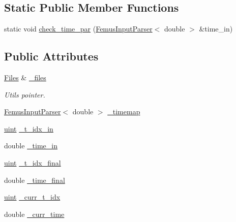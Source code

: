 \subsection*{Static Public Member Functions}
\begin{DoxyCompactItemize}
\item 
static void \mbox{\hyperlink{classfemus_1_1_time_loop_a3fd317c7b76accfc11bc90ef28faa314}{check\+\_\+time\+\_\+par}} (\mbox{\hyperlink{classfemus_1_1_femus_input_parser}{Femus\+Input\+Parser}}$<$ double $>$ \&time\+\_\+in)
\end{DoxyCompactItemize}
\subsection*{Public Attributes}
\begin{DoxyCompactItemize}
\item 
\mbox{\hyperlink{classfemus_1_1_files}{Files}} \& \mbox{\hyperlink{classfemus_1_1_time_loop_ae9163945615963893a94d21a63084676}{\+\_\+files}}
\begin{DoxyCompactList}\small\item\em Utils pointer. \end{DoxyCompactList}\item 
\mbox{\hyperlink{classfemus_1_1_femus_input_parser}{Femus\+Input\+Parser}}$<$ double $>$ \mbox{\hyperlink{classfemus_1_1_time_loop_a0ad720cecced417ce134d55b54b2425d}{\+\_\+timemap}}
\item 
\mbox{\hyperlink{_typedefs_8hpp_a91ad9478d81a7aaf2593e8d9c3d06a14}{uint}} \mbox{\hyperlink{classfemus_1_1_time_loop_ad4afef07e11923ccc8660b3ecb312021}{\+\_\+t\+\_\+idx\+\_\+in}}
\item 
double \mbox{\hyperlink{classfemus_1_1_time_loop_a70b7f421b4428653119817938db3ad04}{\+\_\+time\+\_\+in}}
\item 
\mbox{\hyperlink{_typedefs_8hpp_a91ad9478d81a7aaf2593e8d9c3d06a14}{uint}} \mbox{\hyperlink{classfemus_1_1_time_loop_af6baf9c8f64e06b6c185c4da894992a7}{\+\_\+t\+\_\+idx\+\_\+final}}
\item 
double \mbox{\hyperlink{classfemus_1_1_time_loop_a2f9a639404e384df4da36a2a0c71c589}{\+\_\+time\+\_\+final}}
\item 
\mbox{\hyperlink{_typedefs_8hpp_a91ad9478d81a7aaf2593e8d9c3d06a14}{uint}} \mbox{\hyperlink{classfemus_1_1_time_loop_af353bddb15dfc34a47296817b4eff67a}{\+\_\+curr\+\_\+t\+\_\+idx}}
\item 
double \mbox{\hyperlink{classfemus_1_1_time_loop_a49814512e2f085c3ea0c85681861744a}{\+\_\+curr\+\_\+time}}
\end{DoxyCompactItemize}


